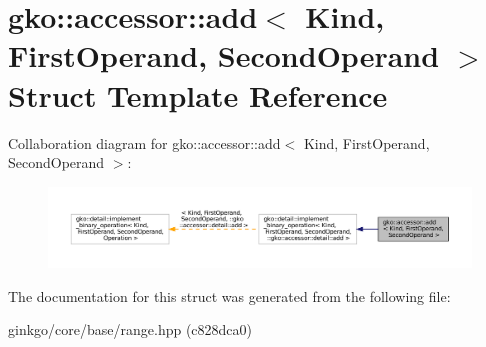\hypertarget{structgko_1_1accessor_1_1add}{}\section{gko\+:\+:accessor\+:\+:add$<$ Kind, First\+Operand, Second\+Operand $>$ Struct Template Reference}
\label{structgko_1_1accessor_1_1add}


Collaboration diagram for gko\+:\+:accessor\+:\+:add$<$ Kind, First\+Operand, Second\+Operand $>$\+:
\nopagebreak
\begin{figure}[H]
\begin{center}
\leavevmode
\includegraphics[width=350pt]{structgko_1_1accessor_1_1add__coll__graph}
\end{center}
\end{figure}


The documentation for this struct was generated from the following file\+:\begin{DoxyCompactItemize}
\item 
ginkgo/core/base/range.\+hpp (c828dca0)\end{DoxyCompactItemize}
